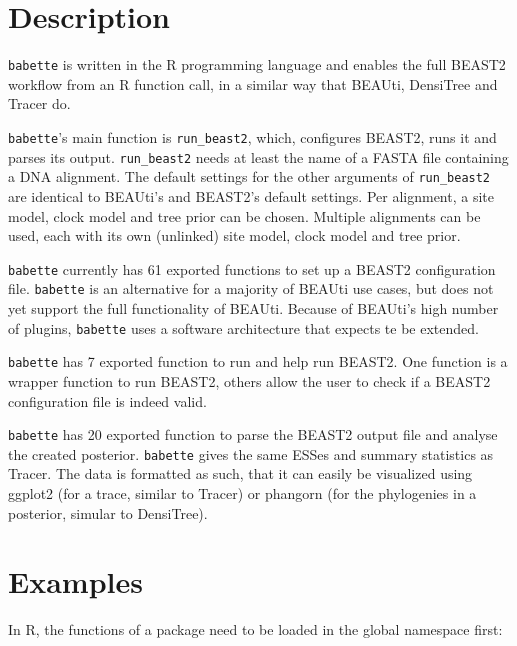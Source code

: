 \documentclass{article}
\begin{document}
\section{Description}

\verb;babette; is written in the R programming language \cite{R}
and enables the full BEAST2 workflow from an R function call,
in a similar way that BEAUti, DensiTree and Tracer do.

\verb;babette;'s main function is \verb;run_beast2;, which, 
configures BEAST2, runs it and parses its output. 
\verb;run_beast2; needs at least the name of a 
FASTA file containing a DNA alignment. 
The default settings for the other arguments of \verb;run_beast2; 
are identical to BEAUti's and BEAST2's default settings.
Per alignment, a site model, clock model and tree prior can be chosen.
Multiple alignments can be used, each with its own (unlinked) site model, 
clock model and tree prior.

\verb;babette; currently has 61 exported functions to set up  
a BEAST2 configuration file. 
\verb;babette; is an alternative for a majority of BEAUti use cases, 
but does not yet support the full functionality of BEAUti. 
Because of BEAUti's high number of plugins, 
\verb;babette; uses a software architecture that expects te be extended.

\verb;babette; has 7 exported function to run and help run BEAST2.
One function is a wrapper function to run BEAST2, others
allow the user to check if a BEAST2 configuration file is indeed valid.

\verb;babette; has 20 exported function to parse the BEAST2 output
file and analyse the created posterior. \verb;babette; gives the
same ESSes and summary statistics as Tracer. The data is formatted
as such, that it can easily be visualized using ggplot2 (for a trace,
similar to Tracer)
or phangorn (for the phylogenies in a posterior, simular to DensiTree). 

\section{Examples}

In R, the functions of a package need to be loaded in the global namespace first:
\end{document}
